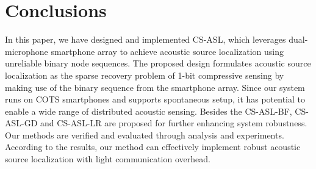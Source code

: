 
\section{Conclusions}


In this paper, we have designed and implemented CS-ASL, which leverages dual-microphone smartphone array to achieve acoustic source localization using unreliable binary node sequences.
%
The proposed design formulates acoustic source localization as the sparse recovery problem of 1-bit compressive sensing  by making use of the binary sequence from the smartphone array. Since our system runs on COTS smartphones and supports spontaneous setup, it has potential to enable a wide range of distributed acoustic sensing. Besides the CS-ASL-BF, CS-ASL-GD and CS-ASL-LR are proposed for further enhancing system robustness.
%
Our methods are verified and evaluated through analysis and experiments. According to the results, our method can effectively implement robust acoustic source localization with light communication overhead. 
%



